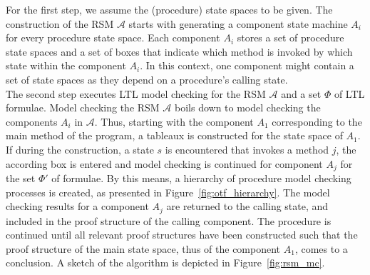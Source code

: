\documentclass[a4paper, 12pt, twoside]{report}
\begin{document}
	For the first step, we assume the (procedure) state spaces to be given. The construction of the RSM $\mathcal{A}$ starts with generating a component state machine $A_i$ for every procedure state space. Each component $A_i$ stores a set of procedure state spaces and a set of boxes that indicate which method is invoked by which state within the component $A_i$. In this context, one component might contain a set of state spaces as they depend on a procedure's calling state.\\
	
	The second step executes LTL model checking for the RSM $\mathcal{A}$ and a set $\Phi$ of LTL formulae. Model checking the RSM $\mathcal{A}$ boils down to model checking the components $A_i$ in $\mathcal{A}$. Thus, starting with the component $A_1$ corresponding to the main method of the program, a tableaux is constructed for the state space of $A_1$. If during the construction, a state $s$ is encountered that invokes a method $j$, the according box is entered and model checking is continued for component $A_j$ for the set $\Phi'$ of formulae. By this means, a hierarchy of procedure model checking processes is created, as presented in Figure~\ref{fig:otf_hierarchy}. The model checking results for a component $A_j$ are returned to the calling state, and included in the proof structure of the calling component. The procedure is continued until all relevant proof structures have been constructed such that the proof structure of the main state space, thus of the component $A_1$, comes to a conclusion. A sketch of the algorithm is depicted in Figure~\ref{fig:rsm_mc}.\\
	
\end{document}
